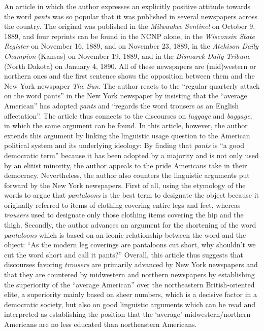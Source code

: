 An article in which the author expresses an explicitly positive attitude towards the word \emph{pants} was so popular that it was published in several newspapers across the country. The original was published in the \emph{Milwaukee Sentinel} on October 9, 1889, and four reprints can be found in the NCNP alone, in the \emph{Wisconsin State Register} on November 16, 1889, and on November 23, 1889, in the \emph{Atchison Daily Champion} (Kansas) on November 19, 1889, and in the \emph{Bismarck Daily Tribune} (North Dakota) on January 4, 1890. All of these newspapers are (mid)western or northern ones and the first sentence shows the opposition between them and the New York newspaper \emph{The Sun}. The author reacts to the “regular quarterly attack on the word pants” in the New York newspaper by insisting that the “average American” has adopted \emph{pants} and “regards the word trousers as an English affectation”. The article thus connects to the discourses on \emph{luggage} and \emph{baggage}, in which the same argument can be found. In this article, however, the author extends this argument by linking the linguistic usage question to the American political system and its underlying ideology: By finding that \emph{pants} is “a good democratic term” because it has been adopted by a majority and is not only used by an elitist minority, the author appeals to the pride Americans take in their democracy. Nevertheless, the author also counters the linguistic arguments put forward by the New York newspapers. First of all, using the etymology of the words to argue that \emph{pantaloons} is the best term to designate the object because it originally referred to items of clothing covering entire legs and feet, whereas \emph{trousers} used to designate only those clothing items covering the hip and the thigh. Secondly, the author advances an argument for the shortening of the word \emph{pantaloons} which is based on an iconic relationship between the word and the object: “As the modern leg coverings are pantaloons cut short, why shouldn’t we cut the word short and call it pants?” Overall, this article thus suggests that discourses favoring \emph{trousers} are primarily advanced by New York newspapers and that they are countered by midwestern and northern newspapers by establishing the superiority of the “average American” over the northeastern British-oriented elite, a superiority mainly based on sheer numbers, which is a decisive factor in a democratic society, but also on good linguistic arguments which can be read and interpreted as establishing the position that the ‘average’ midwestern/northern Americans are no less educated than northeastern Americans.

